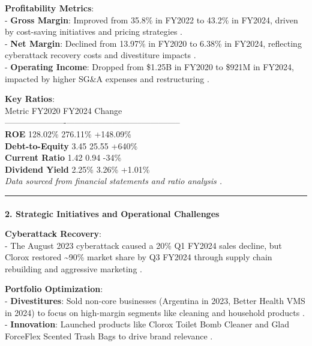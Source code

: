 \documentclass[
  letterpaper,
  DIV=11,
  numbers=noendperiod]{scrartcl}
\makeatletter
\let\oldparagraph\paragraph
\renewcommand{\paragraph}{
    \@ifstar
      \xxxParagraphStar
      \xxxParagraphNoStar
  }
\newcommand{\xxxParagraphStar}[1]{\oldparagraph*{#1}\mbox{}}
\newcommand{\xxxParagraphNoStar}[1]{\oldparagraph{#1}\mbox{}}
\makeatother
\begin{document}
\textbf{Profitability Metrics}:\\
- \textbf{Gross Margin}: Improved from 35.8\% in FY2022 to 43.2\% in
FY2024, driven by cost-saving initiatives and pricing strategies .\\
- \textbf{Net Margin}: Declined from 13.97\% in FY2020 to 6.38\% in
FY2024, reflecting cyberattack recovery costs and divestiture impacts
.\\
- \textbf{Operating Income}: Dropped from \$1.25B in FY2020 to \$921M in
FY2024, impacted by higher SG\&A expenses and restructuring .

\textbf{Key Ratios}:\\
\textbar{} Metric \textbar{} FY2020 \textbar{} FY2024 \textbar{} Change
\textbar{}\\
\textbar----------------------\textbar--------------\textbar--------------\textbar--------------\textbar{}\\
\textbar{} \textbf{ROE} \textbar{} 128.02\% \textbar{} 276.11\%
\textbar{} +148.09\% \textbar{}\\
\textbar{} \textbf{Debt-to-Equity} \textbar{} 3.45 \textbar{} 25.55
\textbar{} +640\% \textbar{}\\
\textbar{} \textbf{Current Ratio} \textbar{} 1.42 \textbar{} 0.94
\textbar{} -34\% \textbar{}\\
\textbar{} \textbf{Dividend Yield} \textbar{} 2.25\% \textbar{} 3.26\%
\textbar{} +1.01\% \textbar{}\\
\emph{Data sourced from financial statements and ratio analysis .}

\begin{center}\rule{0.5\linewidth}{0.5pt}\end{center}

\paragraph{\texorpdfstring{\textbf{2. Strategic Initiatives and
Operational
Challenges}}{2. Strategic Initiatives and Operational Challenges}}\label{strategic-initiatives-and-operational-challenges}

\textbf{Cyberattack Recovery}:\\
- The August 2023 cyberattack caused a 20\% Q1 FY2024 sales decline, but
Clorox restored \textasciitilde90\% market share by Q3 FY2024 through
supply chain rebuilding and aggressive marketing .

\textbf{Portfolio Optimization}:\\
- \textbf{Divestitures}: Sold non-core businesses (Argentina in 2023,
Better Health VMS in 2024) to focus on high-margin segments like
cleaning and household products .\\
- \textbf{Innovation}: Launched products like Clorox Toilet Bomb Cleaner
and Glad ForceFlex Scented Trash Bags to drive brand relevance .
\end{document}
